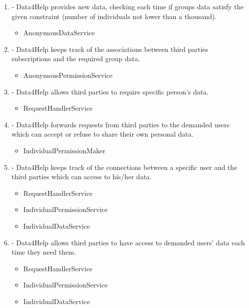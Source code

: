 \documentclass[a4paper]{article}
\begin{document}
\begin{enumerate}[label*=\bf{R.\arabic*}]
\item - Data4Help provides new data, checking each time if groups data satisfy the given constraint (number of individuals not lower than a
thousand).

\begin{itemize}
\item AnonymousDataService
\end{itemize}

\item - Data4Help keeps track of the associations between third parties subscriptions and the required group data.

\begin{itemize}
\item AnonymousPermissionService
\end{itemize}

\item - Data4Help allows third parties to require specific person’s data.

\begin{itemize}
\item RequestHandlerService
\end{itemize}

\item - Data4Help forwards requests from third parties to the demanded users which can accept or refuse to share their own personal data.

\begin{itemize}
\item IndividualPermissionMaker
\end{itemize}

\item - Data4Help keeps track of the connections between a specific user and the third parties which can access to his/her data.

\begin{itemize}
\item RequestHandlerService
\item IndividualPermissionService
\item IndividualDataService
\end{itemize}

\item - Data4Help allows third parties to have access to demanded users’ data each time they need them.

\begin{itemize}
\item RequestHandlerService
\item IndividualPermissionService
\item IndividualDataService
\end{itemize}


\end{enumerate}
\end{document}
